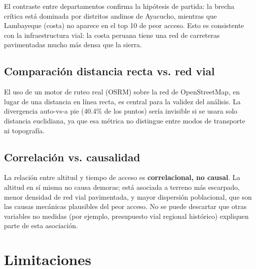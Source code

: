 \documentclass[11pt,a4paper]{article}
\begin{document}
El contraste entre departamentos confirma la hipótesis de partida: la brecha
crítica está dominada por distritos andinos de Ayacucho, mientras que
Lambayeque (costa) no aparece en el top 10 de peor acceso. Esto es consistente
con la infraestructura vial: la costa peruana tiene una red de carreteras
pavimentadas mucho más densa que la sierra.

\subsection{Comparación distancia recta vs. red vial}

El uso de un motor de ruteo real (OSRM) sobre la red de OpenStreetMap, en lugar
de una distancia en línea recta, es central para la validez del análisis. La
divergencia auto-vs-a pie (40.4\% de los puntos) sería invisible si se usara
solo distancia euclidiana, ya que esa métrica no distingue entre modos de
transporte ni topografía.

\subsection{Correlación vs. causalidad}

La relación entre altitud y tiempo de acceso es \textbf{correlacional, no
causal}. La altitud en sí misma no causa demoras; está asociada a terreno más
escarpado, menor densidad de red vial pavimentada, y mayor dispersión
poblacional, que son las causas mecánicas plausibles del peor acceso. No se
puede descartar que otras variables no medidas (por ejemplo, presupuesto vial
regional histórico) expliquen parte de esta asociación.

\section{Limitaciones}
\label{sec:limitaciones}
\end{document}
